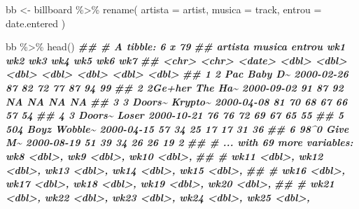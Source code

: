 \documentclass[
  11pt]{report}
\newenvironment{Shaded}{\begin{snugshade}}{\end{snugshade}}
\newcommand{\AttributeTok}[1]{\textcolor[rgb]{0.77,0.63,0.00}{#1}}
\newcommand{\DocumentationTok}[1]{\textcolor[rgb]{0.56,0.35,0.01}{\textbf{\textit{#1}}}}
\newcommand{\FunctionTok}[1]{\textcolor[rgb]{0.00,0.00,0.00}{#1}}
\newcommand{\NormalTok}[1]{#1}
\newcommand{\OtherTok}[1]{\textcolor[rgb]{0.56,0.35,0.01}{#1}}
\newcommand{\SpecialCharTok}[1]{\textcolor[rgb]{0.00,0.00,0.00}{#1}}
\renewenvironment{Shaded}{
    \begin{mdframed}[%
      roundcorner=2pt,%
      innerleftmargin=5pt,%
      innerrightmargin=5pt,%
      topline=true,%
      leftline=true,%
      rightline=true,%
      bottomline=true,%
      linewidth=0.5pt,%
      linecolor=black!20,%
      backgroundcolor=black!2,%
      skipabove=2ex,%
      skipbelow=2.5ex%
    ]%
  }
  {
    \end{mdframed}
  }
\begin{document}
\begin{itemize}
\begin{Shaded}
\begin{Highlighting}[]
\NormalTok{bb }\OtherTok{\textless{}{-}}\NormalTok{ billboard }\SpecialCharTok{\%\textgreater{}\%} 
  \FunctionTok{rename}\NormalTok{(}
    \AttributeTok{artista =}\NormalTok{ artist,}
    \AttributeTok{musica =}\NormalTok{ track,}
    \AttributeTok{entrou =}\NormalTok{ date.entered}
\NormalTok{  )}
\end{Highlighting}
\end{Shaded}

\begin{Shaded}
\begin{Highlighting}[]
\NormalTok{bb }\SpecialCharTok{\%\textgreater{}\%} \FunctionTok{head}\NormalTok{()}
\DocumentationTok{\#\# \# A tibble: 6 x 79}
\DocumentationTok{\#\#   artista  musica  entrou       wk1   wk2   wk3   wk4   wk5   wk6   wk7}
\DocumentationTok{\#\#   \textless{}chr\textgreater{}    \textless{}chr\textgreater{}   \textless{}date\textgreater{}     \textless{}dbl\textgreater{} \textless{}dbl\textgreater{} \textless{}dbl\textgreater{} \textless{}dbl\textgreater{} \textless{}dbl\textgreater{} \textless{}dbl\textgreater{} \textless{}dbl\textgreater{}}
\DocumentationTok{\#\# 1 2 Pac    Baby D\textasciitilde{} 2000{-}02{-}26    87    82    72    77    87    94    99}
\DocumentationTok{\#\# 2 2Ge+her  The Ha\textasciitilde{} 2000{-}09{-}02    91    87    92    NA    NA    NA    NA}
\DocumentationTok{\#\# 3 3 Doors\textasciitilde{} Krypto\textasciitilde{} 2000{-}04{-}08    81    70    68    67    66    57    54}
\DocumentationTok{\#\# 4 3 Doors\textasciitilde{} Loser   2000{-}10{-}21    76    76    72    69    67    65    55}
\DocumentationTok{\#\# 5 504 Boyz Wobble\textasciitilde{} 2000{-}04{-}15    57    34    25    17    17    31    36}
\DocumentationTok{\#\# 6 98\^{}0     Give M\textasciitilde{} 2000{-}08{-}19    51    39    34    26    26    19     2}
\DocumentationTok{\#\# \# ... with 69 more variables: wk8 \textless{}dbl\textgreater{}, wk9 \textless{}dbl\textgreater{}, wk10 \textless{}dbl\textgreater{},}
\DocumentationTok{\#\# \#   wk11 \textless{}dbl\textgreater{}, wk12 \textless{}dbl\textgreater{}, wk13 \textless{}dbl\textgreater{}, wk14 \textless{}dbl\textgreater{}, wk15 \textless{}dbl\textgreater{},}
\DocumentationTok{\#\# \#   wk16 \textless{}dbl\textgreater{}, wk17 \textless{}dbl\textgreater{}, wk18 \textless{}dbl\textgreater{}, wk19 \textless{}dbl\textgreater{}, wk20 \textless{}dbl\textgreater{},}
\DocumentationTok{\#\# \#   wk21 \textless{}dbl\textgreater{}, wk22 \textless{}dbl\textgreater{}, wk23 \textless{}dbl\textgreater{}, wk24 \textless{}dbl\textgreater{}, wk25 \textless{}dbl\textgreater{},}

\end{Highlighting}
\end{Shaded}
\end{itemize}
\end{document}
